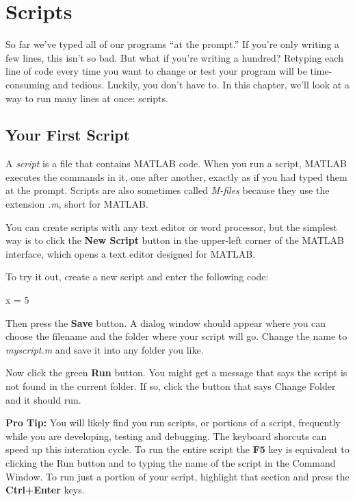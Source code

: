 \chapter{Scripts}

So far we've typed all of our programs ``at the prompt.'' If you're only writing a few lines, this isn't so bad. But what if you're writing a hundred? Retyping each line of code every time you want to change or test your program will be time-consuming and tedious. Luckily, you don't have to. In this chapter, we'll look at a way to run many lines at once: scripts.


\section{Your First Script}

A \emph{script} is a file that contains MATLAB code. When you run a script, MATLAB executes the commands in it, one after another, exactly as if you had typed them at the prompt. Scripts are
also sometimes called \emph{M-files} because they use the extension \emph{.m}, short for MATLAB.


You can create scripts with any text editor or word processor, but the simplest way is to click the \textbf{New Script} button in the upper-left corner of the MATLAB interface, which opens a text editor designed for MATLAB.

To try it out, create a new script and enter the following code:

\begin{code}
x = 5
\end{code}

Then press the \textbf{Save} button.  A dialog window should appear where you can choose the filename and the folder where your script will go.
Change the name to \emph{myscript.m} and save it into any folder you like.

Now click the green \textbf{Run} button.  You might get a message that says the script is not found in the current folder.
If so, click the button that says Change Folder and it should run.


\textbf{Pro Tip:} You will likely find you run scripts, or portions of a script, frequently while you are developing, testing and debugging.  The keyboard shorcuts can speed up this interation cycle.  To run the entire script the \textbf{F5} key is equivalent to clicking the Run button and to typing the name of the script in the Command Window.  To run just a portion of your script, highlight that section and press the \textbf{Ctrl+Enter} keys.

